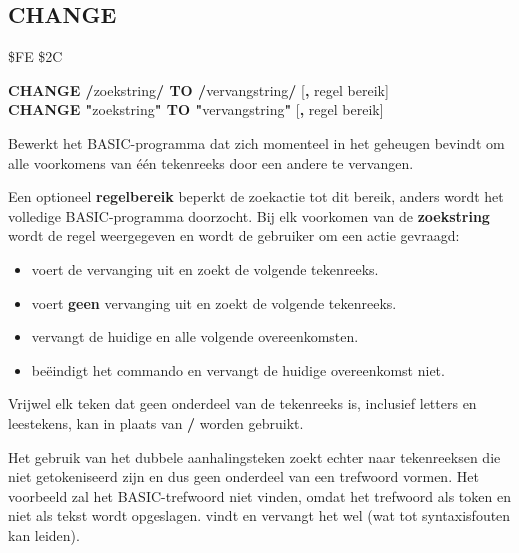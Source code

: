 \newpage
\subsection{CHANGE}
\begin{description}[leftmargin=2cm,style=nextline]
\item [Token:]    \$FE \$2C

\item [Formaat:]   {\bf CHANGE /}zoekstring{\bf/ TO /}vervangstring{\bf/} [{\bf,} regel bereik] \\           		{\bf CHANGE "}zoekstring{\bf" TO "}vervangstring{\bf"} [{\bf,} regel bereik]

\item [Gebruik:]    Bewerkt het BASIC-programma dat zich momenteel in het geheugen bevindt om alle voorkomens van één tekenreeks door een andere te vervangen.

                  Een optioneel {\bf regelbereik} beperkt de zoekactie tot dit bereik, anders wordt het volledige BASIC-programma doorzocht. Bij elk voorkomen van de {\bf zoekstring} wordt de regel weergegeven en wordt de gebruiker om een actie gevraagd:
                  \begin{itemize}
                     \item {}  voert de vervanging uit en zoekt de volgende tekenreeks.                     \item {}  voert {\bf geen} vervanging uit en zoekt de volgende tekenreeks.                     \item \megakey{*}  vervangt de huidige en alle volgende overeenkomsten.                     \item {} beëindigt het commando en vervangt de huidige overeenkomst niet.
                  \end{itemize}

                  \item [Opmerkingen:]  Vrijwel elk teken dat geen onderdeel van de tekenreeks is, inclusief letters en leestekens, kan in plaats van {\bf /} worden gebruikt.

                  Het gebruik van het dubbele aanhalingsteken zoekt echter naar tekenreeksen die niet getokeniseerd zijn en dus geen onderdeel van een trefwoord vormen. Het voorbeeld  zal het BASIC-trefwoord  niet vinden, omdat het trefwoord als token en niet als tekst wordt opgeslagen.  vindt en vervangt het wel (wat tot syntaxisfouten kan leiden).


\end{description}
